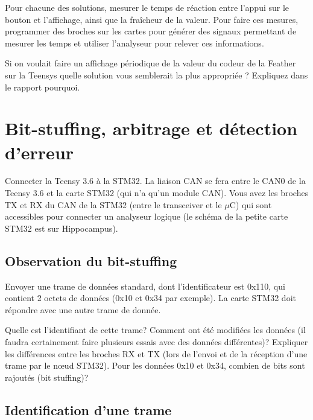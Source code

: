 \documentclass[11pt]{paper}
\begin{document}
%
%

Pour chacune des solutions, mesurer le temps de réaction entre l'appui sur le bouton et l'affichage, ainsi que la fraîcheur de la valeur. Pour faire ces mesures, programmer des broches sur les cartes pour générer des signaux permettant de mesurer les temps et utiliser l'analyseur pour relever ces informations.

Si on voulait faire un affichage périodique de la valeur du codeur de la Feather sur la Teensys quelle solution vous semblerait la plus appropriée ? Expliquez dans le rapport pourquoi.


\section{Bit-stuffing, arbitrage et détection d'erreur}

Connecter la Teensy 3.6 à la STM32. La liaison CAN se fera entre le CAN0 de la Teensy 3.6 et la carte STM32 (qui n’a qu’un module CAN).
Vous avez les broches TX et RX du CAN de la STM32 (entre le transceiver et le $\mu$C) qui sont accessibles pour connecter un analyseur logique (le schéma de la petite carte STM32 est sur Hippocampus).

\subsection{Observation du bit-stuffing}

Envoyer une trame de données standard, dont l'identificateur est 0x110, qui contient 2 octets de données (0x10 et 0x34 par exemple). La carte STM32 doit répondre avec une autre trame de donnée.

Quelle est l’identifiant de cette trame? Comment ont été modifiées les données (il faudra certainement faire plusieurs essais avec des données différentes)? Expliquer les différences entre les broches RX et TX (lors de l’envoi et de la réception d’une trame par le nœud STM32). Pour les données 0x10 et 0x34, combien de bits sont rajoutés (bit stuffing)?

\subsection{Identification d'une trame}
\end{document}
